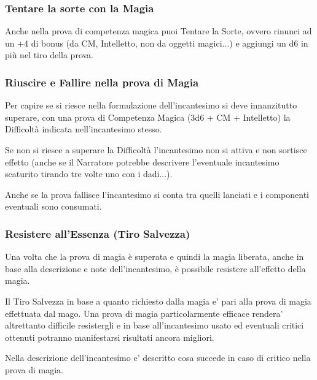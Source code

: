 \begin{multicols}{2}
\subsubsection{Tentare la sorte con la Magia}

\label{tentare-la-sorte-con-la-magia}

Anche nella prova di competenza magica puoi Tentare la Sorte, ovvero rinunci ad un +4 di bonus (da CM, Intelletto, non da oggetti magici...) e aggiungi un d6 in più nel tiro della prova.

\subsubsection{Riuscire e Fallire nella prova di Magia}

Per capire se si riesce nella formulazione dell'incantesimo si deve innanzitutto superare, con una prova di Competenza Magica (3d6 + CM + Intelletto) la Difficoltà indicata nell'incantesimo stesso.

Se non si riesce a superare la Difficoltà l'incantesimo non si attiva e non sortisce effetto (anche se il Narratore potrebbe descrivere l'eventuale incantesimo scaturito tirando tre volte uno con i dadi...).

Anche se la prova fallisce l'incantesimo si conta tra quelli lanciati e i componenti eventuali sono consumati.

\subsubsection{Resistere all'Essenza (Tiro Salvezza)}

\label{resistere-allessenza-tiro-salvezza}

Una volta che la prova di magia è superata e quindi la magia liberata, anche in base alla descrizione e note dell'incantesimo, è possibile resistere all'effetto della magia.

Il Tiro Salvezza in base a quanto richiesto dalla magia e' pari alla prova di magia effettuata dal mago. Una prova di magia particolarmente efficace rendera' altrettanto difficile resistergli e in base all'incantesimo usato ed eventuali critici ottenuti potranno manifestarsi risultati ancora migliori.

Nella descrizione dell'incantesimo e' descritto cosa succede in caso di critico nella prova di magia.


\end{multicols}
